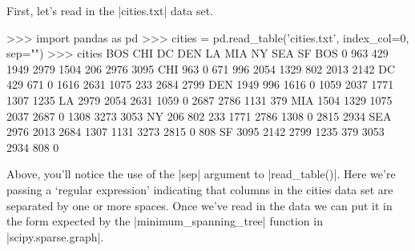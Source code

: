 First, let's read in the |cities.txt| data set.
\begin{python}
>>> import pandas as pd
>>> cities = pd.read_table('cities.txt', index_col=0, sep="\s*")
>>> cities
      BOS   CHI    DC   DEN    LA   MIA    NY   SEA    SF
BOS     0   963   429  1949  2979  1504   206  2976  3095
CHI   963     0   671   996  2054  1329   802  2013  2142
DC    429   671     0  1616  2631  1075   233  2684  2799
DEN  1949   996  1616     0  1059  2037  1771  1307  1235
LA   2979  2054  2631  1059     0  2687  2786  1131   379
MIA  1504  1329  1075  2037  2687     0  1308  3273  3053
NY    206   802   233  1771  2786  1308     0  2815  2934
SEA  2976  2013  2684  1307  1131  3273  2815     0   808
SF   3095  2142  2799  1235   379  3053  2934   808     0
\end{python}
%
Above, you'll notice the use of the |sep| argument to |read_table()|.  Here we're passing a `regular expression' indicating that columns in the cities data set are separated by one or more spaces.  Once we've read in the data we can put it in the form expected by the |minimum_spanning_tree| function in |scipy.sparse.graph|.

